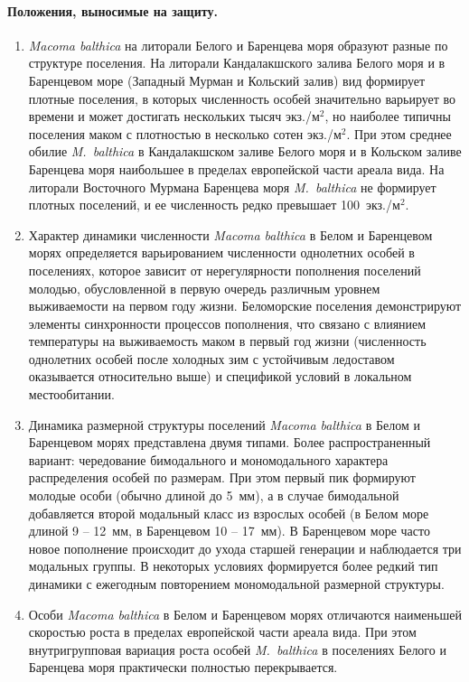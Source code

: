 \paragraph{Положения, выносимые на защиту.}
\begin{enumerate}
\item \textit{Macoma balthica} на литорали Белого и Баренцева моря образуют разные по структуре поселения.
На литорали Кандалакшского залива Белого моря и в Баренцевом море (Западный Мурман и Кольский залив) вид  формирует плотные поселения, в которых численность особей значительно варьирует во времени и может достигать нескольких тысяч экз./м$^2$, но наиболее типичны поселения маком с плотностью в несколько сотен экз./м$^2$. 
При этом среднее обилие \textit{M.~balthica} в Кандалакшском заливе Белого моря и в Кольском заливе Баренцева моря наибольшее в пределах европейской части ареала вида.
На литорали Восточного Мурмана Баренцева моря \textit{M.~balthica} не формирует плотных поселений, и ее численность редко превышает 100~экз./м$^2$.

\item Характер динамики численности \textit{Macoma balthica} в Белом и Баренцевом морях определяется варьированием численности однолетних особей в поселениях, которое зависит от нерегулярности пополнения поселений молодью, обусловленной в первую очередь различным уровнем выживаемости на первом году жизни.
Беломорские поселения демонстрируют элементы синхронности процессов пополнения, что связано с влиянием температуры на выживаемость маком в первый год жизни  (численность однолетних особей после холодных зим с устойчивым ледоставом оказывается относительно выше) и спецификой условий в локальном местообитании.

\item Динамика размерной структуры поселений {\it Macoma balthica} в Белом и Баренцевом морях представлена двумя типами. 
Более распространенный вариант: чередование бимодального и мономодального характера распределения особей по размерам. 
При этом первый пик формируют молодые особи (обычно длиной до 5~мм), а в случае бимодальной добавляется второй модальный класс из взрослых особей (в Белом море длиной 9 -- 12~мм, в Баренцевом 10 -- 17~мм). 
В Баренцевом море часто новое пополнение происходит до ухода старшей генерации и наблюдается три модальных группы.
В некоторых условиях формируется более редкий тип динамики с ежегодным повторением мономодальной размерной структуры. 

\item Особи {\it Macoma balthica} в Белом и Баренцевом морях отличаются наименьшей скоростью роста в пределах европейской части ареала вида. 
При этом внутригрупповая вариация роста особей \textit{M.~balthica} в поселениях Белого и Баренцева моря практически полностью перекрывается.

\end{enumerate}


